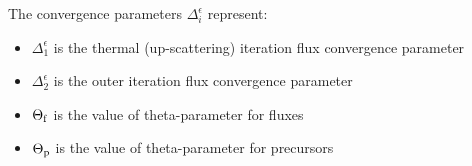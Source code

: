 The convergence parameters $\Delta_i^\epsilon$ represent:
\begin{itemize}
\item $\Delta_1^\epsilon$ is the thermal (up-scattering) iteration flux convergence parameter
\item $\Delta_2^\epsilon$ is the outer iteration flux convergence parameter
\item $\Theta_{\rm f}$ is the value of theta-parameter for fluxes
\item $\Theta_{\rm p}$ is the value of theta-parameter for precursors
\end{itemize}

\eject
